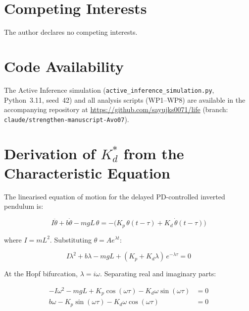 \documentclass[12pt, letterpaper]{article}
\newcommand{\Kd}{K_d}
\newcommand{\Kdcrit}{K_d^{*}}
\begin{document}
\section*{Competing Interests}

The author declares no competing interests.

\section*{Code Availability}

The Active Inference simulation (\texttt{active\_inference\_simulation.py},
Python~3.11, seed~42) and all analysis scripts (WP1--WP8) are available in the
accompanying repository at \url{https://github.com/sayujks0071/life}
(branch: \texttt{claude/strengthen-manuscript-Avo07}).




\newpage
\appendix

\section{Derivation of $\Kdcrit$ from the Characteristic Equation}
\label{app:derivation}

The linearised equation of motion for the delayed PD-controlled inverted pendulum
is:

\begin{equation}
  I\ddot{\theta} + b\dot{\theta} - mgL\,\theta
    = -\bigl(K_p\,\theta(t-\tau) + \Kd\,\dot{\theta}(t-\tau)\bigr)
\end{equation}

where $I = mL^{2}$. Substituting $\theta = Ae^{\lambda t}$:

\begin{equation*}
  I\lambda^{2} + b\lambda - mgL
    + (K_p + \Kd\lambda)\,e^{-\lambda\tau} = 0
\end{equation*}

At the Hopf bifurcation, $\lambda = i\omega$. Separating real and imaginary parts:

\begin{align*}
  -I\omega^{2} - mgL + K_p\cos(\omega\tau)
    - \Kd\omega\sin(\omega\tau) &= 0 \tag{Real} \\
  b\omega - K_p\sin(\omega\tau)
    - \Kd\omega\cos(\omega\tau) &= 0  \tag{Imaginary}
\end{align*}
\end{document}
